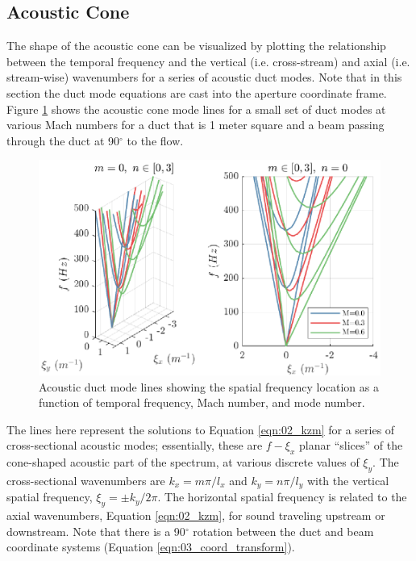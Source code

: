 \subsection{Acoustic Cone}
\label{sect:04_acoustic_cone}
The shape of the acoustic cone can be visualized by plotting the relationship between the temporal frequency and the vertical (i.e. cross-stream) and axial (i.e. stream-wise) wavenumbers for a series of acoustic duct modes.
Note that in this section the duct mode equations are cast into the aperture coordinate frame.
Figure \ref{fig:04_dispersion_sound} shows the acoustic cone mode lines for a small set of duct modes at various Mach numbers for a duct that is 1 meter square and a beam passing through the duct at 90$^\circ$ to the flow.
\begin{figure}
  \centering
  \includegraphics{../matlab/04_dispersion_analysis/dispersion_sound.eps}
  \caption{Acoustic duct mode lines showing the spatial frequency location as a function of temporal frequency, Mach number, and mode number.}
  \label{fig:04_dispersion_sound}
\end{figure}
The lines here represent the solutions to Equation \ref{eqn:02_kzm} for a series of cross-sectional acoustic modes; essentially, these are $f-\xi_x$ planar ``slices'' of the cone-shaped acoustic part of the spectrum, at various discrete values of $\xi_y$.
The cross-sectional wavenumbers are $k_x = m\pi/l_x$ and $k_y = n\pi/l_y$ with the vertical spatial frequency, $\xi_y=\pm k_y/2\pi$.
The horizontal spatial frequency is related to the axial wavenumbers, Equation \ref{eqn:02_kzm}, for sound traveling upstream or downstream.
Note that there is a 90$^\circ$ rotation between the duct and beam coordinate systems (Equation \ref{eqn:03_coord_transform}).

